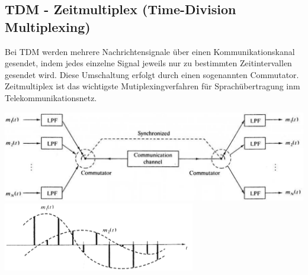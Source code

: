 \subsection{TDM - Zeitmultiplex (Time-Division Multiplexing)}
Bei TDM werden mehrere Nachrichtensignale über einen Kommunikationskanal gesendet, indem jedes
einzelne Signal jeweils nur zu bestimmten Zeitintervallen gesendet wird. Diese Umschaltung erfolgt
durch einen sogenannten Commutator. \\
Zeitmultiplex ist das wichtigste Mutiplexingverfahren für
Sprachübertragung inm Telekommunikationsnetz.
\begin{center}
    \includegraphics[width=14cm]{bilder/multiplex_tdm_blockdiagramm.png} \\
    \includegraphics[height=3cm]{bilder/multiplex_tdm_zeitdiagramm.png}     
\end{center}
